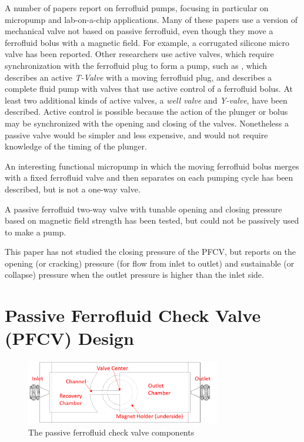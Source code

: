 \documentclass[]{asme2ej}
\begin{document}
A number of papers report on ferrofluid pumps, focusing in particular
on micropump and lab-on-a-chip applications\cite{ozbey2015modeling,hsu2018biocompatible}.
Many of these papers use
a version of mechanical valve not based on passive
ferrofluid, even though they move a ferrofluid bolus
with a magnetic field.
For example,
a corrugated silicone micro valve\cite{yamahata2003ferrofluid,yamahata2005plastic}
has been reported.
Other researchers use active valves, which require synchronization with
the ferrofluid plug to form a pump,
such as \cite{menz2000fluidic}, which
describes an active {\em T-Valve} with a moving ferrofluid plug, and
\cite{ando2009ferrofluidic} describes a complete fluid pump with valves
that use
active control of a ferrofluid bolus.
At least two additional kinds of active valves, a {\em well valve} and
{\em Y-valve}, have
been described\cite{hartshorne2004ferrofluid}.
Active control is possible because the
action of the plunger or bolus may be synchronized with the opening and closing
of the valves.
Nonetheless a passive valve would be simpler and less
expensive, and would not require knowledge of the timing of the
plunger.

An interesting functional micropump in which the
moving ferrofluid bolus merges with a fixed ferrofluid valve and then
separates on each pumping cycle has been described\cite{hatch2001ferrofluidic},
but is not a one-way valve.

A passive ferrofluid two-way valve with tunable
opening and closing pressure based on magnetic
field strength\cite{paschalis2013novel} has been tested,
but could not be passively used to make a pump.

This paper has not studied the closing pressure of the PFCV, but reports on
the opening (or cracking) pressure (for flow from inlet to outlet) and
sustainable (or collapse) pressure
when the outlet pressure is higher than the inlet side.

\section{Passive Ferrofluid Check Valve (PFCV) Design}
\begin{figure}
\centerline{\includegraphics[width=3.34in]{figure/Figure1.png}}
\caption{The passive ferrofluid check valve components}
\label{fig_components}
\end{figure}
\end{document}

